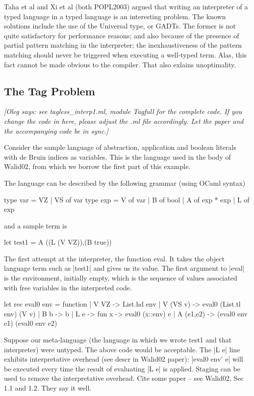 \documentclass[preprint]{sigplanconf}
\newcommand{\oleg}[1]{{\it [Oleg says: #1]}}
\begin{document}
        Taha et al and Xi et al (both POPL2003) argued that writing an
interpreter of a typed language in a typed language is an interesting
problem. The known solutions include the use of the Universal type, or
GADTs. The former is not quite satisfactory for performance reasons;
and also because of the presence of partial pattern matching in the
interpreter; the inexhaustiveness of the pattern matching should never
be triggered when executing a well-typed term. Alas, this fact cannot
be made obvious to the compiler. That also exlains unoptimality.


\subsection{The Tag Problem}\label{tagproblem}

\oleg{see tagless\_interp1.ml, module Tagfull for the complete code.
  If you change the code in here, please adjust the .ml file
  accordingly. Let the paper and the accompanying code be in sync.}


Consider the sample language of abstraction, application and boolean
literals with de Bruin indices as variables. This is the language used
in the body of Walid02, from which we borrow the first part of 
this example.

The language can be described by the following grammar (using OCaml
syntax)


\begin{code}
  type var = VZ | VS of var
  type exp = V of var | B of bool | A of exp * exp | L of exp
\end{code}

and a sample term is
\begin{code}
  let test1 = A ((L (V VZ)),(B true))
\end{code}

The first attempt at the interpreter, the function eval. It takes the
object language term such as |test1| and gives us its value.
The first argument to |eval| is the environment, initially empty,
which is the sequence of values associated with free variables in the
interpreted code.
\begin{code}
  let rec eval0 env = function 
  | V VZ -> List.hd env
  | V (VS v) -> eval0 (List.tl env) (V v)
  | B b -> b 
  | L e -> fun x -> eval0 (x::env) e
  | A (e1,e2) -> (eval0 env e1) (eval0 env e2) 
\end{code}

Suppose our meta-language (the language in which we wrote test1
and that interpreter) were untyped. The above code would be acceptable.
The |L e| line exhibits interpretative overhead (see descr in Walid02
paper): |eval0 env' e| will be executed every time the result of
evaluating |L e| is applied. Staging can be used to remove the
interpretative overhead. Cite some paper -- see Walid02, Sec 1.1 and
1.2. They say it well.
\end{document}
